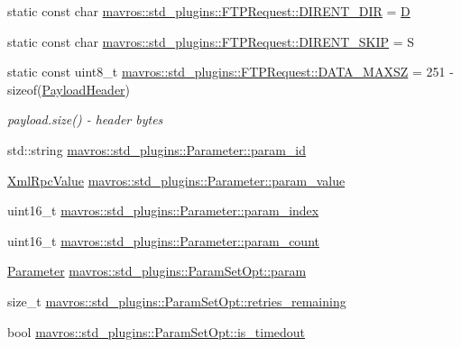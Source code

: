 \begin{DoxyCompactItemize}
\item 
static const char \mbox{\hyperlink{group__plugin_ga4968be6fa6605fa70b81152e83bbef67}{mavros\+::std\+\_\+plugins\+::\+F\+T\+P\+Request\+::\+D\+I\+R\+E\+N\+T\+\_\+\+D\+IR}} = \textquotesingle{}\mbox{\hyperlink{mavlink__sha256_8h_af316c33cc298530f245e8b55330e86b5}{D}}\textquotesingle{}
\item 
static const char \mbox{\hyperlink{group__plugin_ga5628fc53877a3f7a45b2ec1ec2a8652e}{mavros\+::std\+\_\+plugins\+::\+F\+T\+P\+Request\+::\+D\+I\+R\+E\+N\+T\+\_\+\+S\+K\+IP}} = \textquotesingle{}S\textquotesingle{}
\item 
static const uint8\+\_\+t \mbox{\hyperlink{group__plugin_gad25555fafe3a6aa0f078fec9099a6431}{mavros\+::std\+\_\+plugins\+::\+F\+T\+P\+Request\+::\+D\+A\+T\+A\+\_\+\+M\+A\+X\+SZ}} = 251 -\/ sizeof(\mbox{\hyperlink{structmavros_1_1std__plugins_1_1FTPRequest_1_1PayloadHeader}{Payload\+Header}})
\begin{DoxyCompactList}\small\item\em payload.\+size() -\/ header bytes \end{DoxyCompactList}\item 
std\+::string \mbox{\hyperlink{group__plugin_ga6e9b1d000a31b2ca2773ff03c28980da}{mavros\+::std\+\_\+plugins\+::\+Parameter\+::param\+\_\+id}}
\item 
\mbox{\hyperlink{group__plugin_gafe570e1ad21e55964c02084e1a485c92}{Xml\+Rpc\+Value}} \mbox{\hyperlink{group__plugin_ga91eae662f2d0f3b1a796940ab770c9f2}{mavros\+::std\+\_\+plugins\+::\+Parameter\+::param\+\_\+value}}
\item 
uint16\+\_\+t \mbox{\hyperlink{group__plugin_ga531408831574f2bcf7311ddae08a1b1e}{mavros\+::std\+\_\+plugins\+::\+Parameter\+::param\+\_\+index}}
\item 
uint16\+\_\+t \mbox{\hyperlink{group__plugin_ga962048d830e7dea388e9c9956e1a5b1b}{mavros\+::std\+\_\+plugins\+::\+Parameter\+::param\+\_\+count}}
\item 
\mbox{\hyperlink{classmavros_1_1std__plugins_1_1Parameter}{Parameter}} \mbox{\hyperlink{group__plugin_ga76100850b31cc9972cb5ce440d1a4684}{mavros\+::std\+\_\+plugins\+::\+Param\+Set\+Opt\+::param}}
\item 
size\+\_\+t \mbox{\hyperlink{group__plugin_ga248de6628eca54d86cc6b52623434639}{mavros\+::std\+\_\+plugins\+::\+Param\+Set\+Opt\+::retries\+\_\+remaining}}
\item 
bool \mbox{\hyperlink{group__plugin_gad60618c9119e01a1c6aecc962d324ac3}{mavros\+::std\+\_\+plugins\+::\+Param\+Set\+Opt\+::is\+\_\+timedout}}

\end{DoxyCompactItemize}
